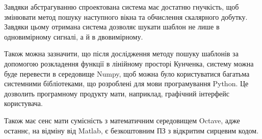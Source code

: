     Завдяки абстрагуванню спроектована система має достатню гнучкість, щоб змінювати метод пошуку наступного вікна та
    обчислення скалярного добутку.
    Завдяки цьому отримана система дозволяє шукати шаблон не лише в одновимірному сигналі, а й в двовимірному.

    Також можна зазначити, що після дослідження методу пошуку шаблонів за допомогою розкладення функції в лінійному
    просторі Кунченка, систему можна буде перевести в середовище Numpy, щоб можна було користуватися багатьма
    системними бібліотеками, що розроблені для мови програмування Python.
    Це дозволить програмному продукту мати, наприклад, графічний інтерфейс користувача.

    Також має сенс мати сумісність з математичним середовищем Octave, адже останнє, на відміну від Matlab, є
    безкоштовним ПЗ з відкритим сирцевим кодом.


